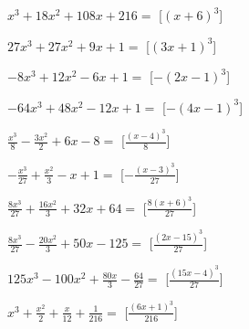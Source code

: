 \begin{esercizio}
\begin{multicols}{2}
\begin{enumeratea}
\item \(x^{3} + 18 x^{2} + 108 x + 216=\) 
\hfill [\(\left(x + 6\right)^{3}\)]
\item \(27 x^{3} + 27 x^{2} + 9 x + 1=\) 
\hfill [\(\left(3 x + 1\right)^{3}\)]
\item \(- 8 x^{3} + 12 x^{2} - 6 x + 1=\) 
\hfill [\(- \left(2 x - 1\right)^{3}\)]
\item \(- 64 x^{3} + 48 x^{2} - 12 x + 1=\) 
\hfill [\(- \left(4 x - 1\right)^{3}\)]
\item \(\frac{x^{3}}{8} - \frac{3 x^{2}}{2} + 6 x - 8=\) 
\hfill [\(\frac{\left(x - 4\right)^{3}}{8}\)]
\item \(- \frac{x^{3}}{27} + \frac{x^{2}}{3} - x + 1=\) 
\hfill [\(- \frac{\left(x - 3\right)^{3}}{27}\)]
\item \(\frac{8 x^{3}}{27} + \frac{16 x^{2}}{3} + 32 x + 64=\) 
\hfill [\(\frac{8 \left(x + 6\right)^{3}}{27}\)]
\item \(\frac{8 x^{3}}{27} - \frac{20 x^{2}}{3} + 50 x - 125=\) 
\hfill [\(\frac{\left(2 x - 15\right)^{3}}{27}\)]
\item \(125 x^{3} - 100 x^{2} + \frac{80 x}{3} - \frac{64}{27}=\) 
\hfill [\(\frac{\left(15 x - 4\right)^{3}}{27}\)]
\item \(x^{3} + \frac{x^{2}}{2} + \frac{x}{12} + \frac{1}{216}=\) 
\hfill [\(\frac{\left(6 x + 1\right)^{3}}{216}\)]

\end{enumeratea}
\end{multicols}
\end{esercizio}
